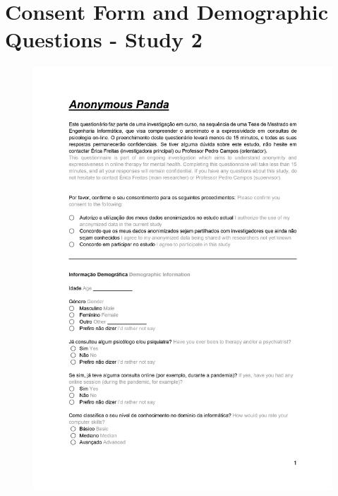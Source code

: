 \clearpage
\section{Consent Form and Demographic Questions - Study 2}
\label{appendix:consentDemographic}
\begin{figure}[h!]
\centering
\includegraphics[width=\textwidth]{figures/02_01.jpg}
\end{figure}

\clearpage
